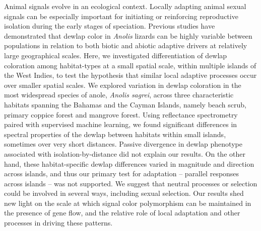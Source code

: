 Animal signals evolve in an ecological context. Locally adapting animal sexual signals can be especially important for initiating or reinforcing reproductive isolation during the early stages of speciation. Previous studies have demonstrated that dewlap color in \textit{Anolis} lizards can be highly variable between populations in relation to both biotic and abiotic adaptive drivers at relatively large geographical scales. Here, we investigated differentiation of dewlap coloration among habitat-types at a small spatial scale, within multiple islands of the West Indies, to test the hypothesis that similar local adaptive processes occur over smaller spatial scales. We explored variation in dewlap coloration in the most widespread species of anole, \textit{Anolis sagrei}, across three characteristic habitats spanning the Bahamas and the Cayman Islands, namely beach scrub, primary coppice forest and mangrove forest. Using reflectance spectrometry paired with supervised machine learning, we found significant differences in spectral properties of the dewlap between habitats within small islands, sometimes over very short distances. Passive divergence in dewlap phenotype associated with isolation-by-distance did not explain our results. On the other hand, these habitat-specific dewlap differences varied in magnitude and direction across islands, and thus our primary test for adaptation -- parallel responses across islands -- was not supported. We suggest that neutral processes or selection could be involved in several ways, including sexual selection. Our results shed new light on the scale at which signal color polymorphism can be maintained in the presence of gene flow, and the relative role of local adaptation and other processes in driving these patterns.

